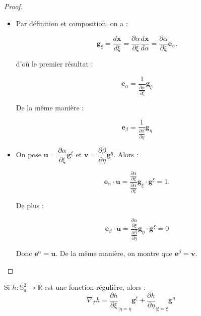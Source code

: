 \begin{proof}
\begin{itemize}
\item Par définition et composition, on a :

\begin{equation}
\mathbf{g}_{\xi} = \dfrac{d \mathbf{x}}{d \xi} = \dfrac{\partial \alpha}{\partial \xi} \dfrac{d \mathbf{x}}{d \alpha} = \dfrac{\partial \alpha}{\partial \xi} \mathbf{e}_{\alpha}.
\end{equation}

d'où le premier résultat :

\begin{equation}
\mathbf{e}_{\alpha} = \dfrac{1}{\frac{\partial \alpha}{\partial \xi}} \mathbf{g}_{\xi}
\end{equation}

De la même manière :

\begin{equation}
\mathbf{e}_{\beta} = \dfrac{1}{\frac{\partial \beta}{\partial \eta}} \mathbf{g}_{\eta}
\end{equation}

\item On pose $\mathbf{u} = \dfrac{\partial \alpha}{\partial \xi} \mathbf{g}^{\xi}$ et $\mathbf{v} = \dfrac{\partial \beta}{\partial \eta} \mathbf{g}^{\eta}$. Alors :

\begin{equation}
\mathbf{e}_{\alpha} \cdot \mathbf{u} = \dfrac{\frac{\partial \alpha}{\partial \xi}}{\frac{\partial \alpha}{\partial \xi}} \mathbf{g}_{\xi} \cdot \mathbf{g}^{\xi} = 1.
\end{equation}

De plus :

\begin{equation}
\mathbf{e}_{\beta} \cdot \mathbf{u} = \dfrac{\frac{\partial \alpha}{\partial \xi}}{\frac{\partial \beta}{\partial \eta}} \mathbf{g}_{\eta} \cdot \mathbf{g}^{\xi} = 0
\end{equation}

Donc $\mathbf{e}^{\alpha} = \mathbf{u}$. De la même manière, on montre que $\mathbf{e}^{\beta} = \mathbf{v}$.
\end{itemize}
\end{proof}




\begin{theoreme}
Si $h : \mathbb{S}_a^2 \rightarrow \mathbb{R}$ est une fonction régulière, alors :
\begin{equation}
\nabla_T h = \dfrac{\partial h}{\partial \xi}_{|\eta = \bar{\eta}} \mathbf{g}^{\xi} + \dfrac{\partial h}{\partial \eta}_{|\xi = \bar{\xi}} \mathbf{g}^{\eta}
\end{equation}
\label{th:gradient_xieta}
\end{theoreme}


